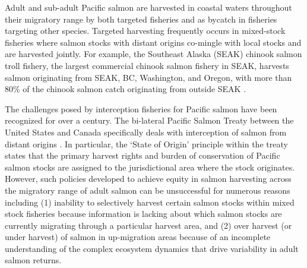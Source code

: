 Adult and sub-adult Pacific salmon are harvested in coastal waters
throughout their migratory range by both targeted fisheries and as
bycatch in fisheries targeting other species. Targeted harvesting
frequently occurs in mixed-stock fisheries where salmon stocks with
distant origins co-mingle with local stocks and are harvested jointly.
For example, the Southeast Alaska (SEAK) chinook salmon troll fishery,
the largest commercial chinook salmon fishery in SEAK, harvests salmon
originating from SEAK, BC, Washington, and Oregon, with more than 80\%
of the chinook salmon catch originating from outside SEAK
\citep{Templin2004}.

The challenges posed by interception fisheries for Pacific salmon have
been recognized for over a century. The bi-lateral Pacific Salmon Treaty
between the United States and Canada specifically deals with
interception of salmon from distant origins
\citep{Knight2000, Noakes2005b}. In particular, the `State of Origin'
principle within the treaty states that the primary harvest rights and
burden of conservation of Pacific salmon stocks are assigned to the
jurisdictional area where the stock originates. However, such policies
developed to achieve equity in salmon harvesting across the migratory
range of adult salmon can be unsuccessful for numerous reasons including
(1) inability to selectively harvest certain salmon stocks within mixed
stock fisheries because information is lacking about which salmon stocks
are currently migrating through a particular harvest area, and (2) over
harvest (or under harvest) of salmon in up-migration areas because of an
incomplete understanding of the complex ecosystem dynamics that drive
variability in adult salmon returns.

